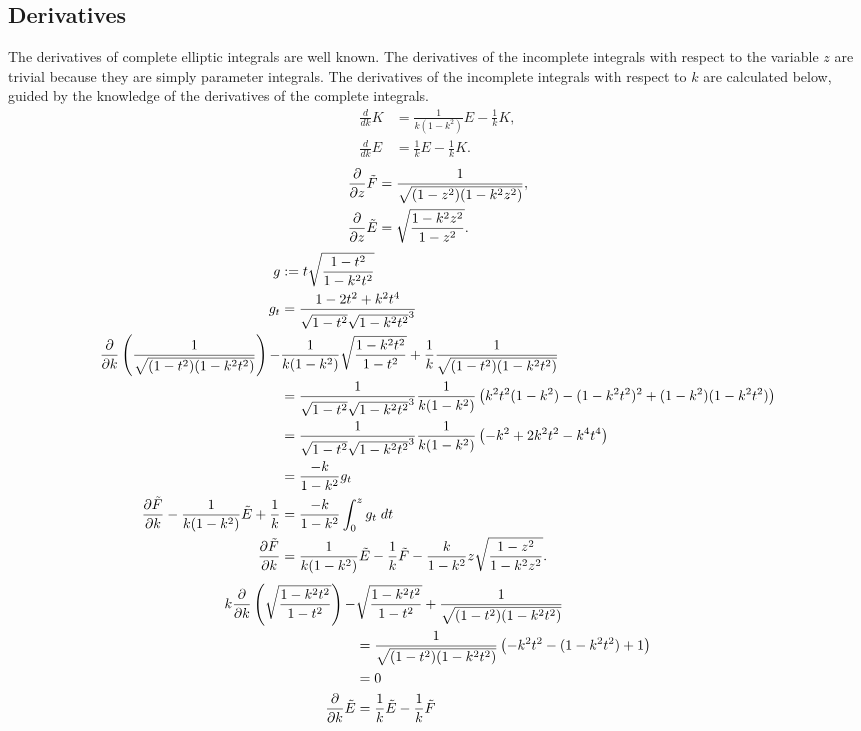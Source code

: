 \subsection{Derivatives}
\label{sub:Derivatives}
The derivatives of complete elliptic integrals are well known. The derivatives of the incomplete integrals with respect to the variable $z$ are trivial because they are simply parameter integrals. The derivatives of the incomplete integrals with respect to $k$ are calculated below, guided by the knowledge of the derivatives of the complete integrals.
\begin{align}
\frac{d}{dk}K &= \frac{1}{k(1-k^2)}E - \frac{1}{k}K, \\
\frac{d}{dk}E &= \frac{1}{k}E - \frac{1}{k} K.
\end{align}
\begin{align}
\frac{\partial }{\partial z}\tilde F &= \frac{1}{\sqrt{(1-z^2)(1-k^2 z^2)}}, \\
\frac{\partial }{\partial z}\tilde E &= \sqrt{\frac{1-k^2 z^2}{1-z^2}}.
\end{align}
\begin{align}
g &:= t\sqrt{\frac{1-t^2}{1-k^2t^2}} \\
g_t &= \frac{1-2t^2 + k^2 t^4}{\sqrt{1-t^2}\sqrt{1-k^2t^2}^3} \\
\frac{\partial }{\partial k}\left(\frac{1}{\sqrt{(1-t^2)(1-k^2 t^2)}}\right) -& \frac{1}{k(1-k^2)}\sqrt{\frac{1-k^2 t^2}{1-t^2}} + \frac{1}{k}\frac{1}{\sqrt{(1-t^2)(1-k^2 t^2)}} \\
&= \frac{1}{\sqrt{1-t^2}\sqrt{1-k^2t^2}^3}\frac{1}{k(1-k^2)}\left( k^2t^2(1-k^2) - (1-k^2t^2)^2 + (1-k^2)(1-k^2t^2) \right) \\
&= \frac{1}{\sqrt{1-t^2}\sqrt{1-k^2t^2}^3}\frac{1}{k(1-k^2)}\left( -k^2 + 2k^2t^2 -k^4t^4\right) \\
&= \frac{-k}{1-k^2}g_t \\
\frac{\partial \tilde F}{\partial k} - \frac{1}{k(1-k^2)}\tilde E + \frac{1}{k} &= \frac{-k}{1-k^2}\int_0^z g_t\; dt \\
\frac{\partial \tilde F}{\partial k} &= \frac{1}{k(1-k^2)}\tilde E - \frac{1}{k}\tilde F - \frac{k}{1-k^2}z\sqrt{\frac{1-z^2}{1-k^2z^2}}.
\end{align}
\begin{align}
k\frac{\partial }{\partial k}\left(\sqrt{\frac{1-k^2t^2}{1-t^2}}\right) -& \sqrt{\frac{1-k^2t^2}{1-t^2}} + \frac{1}{\sqrt{(1-t^2)(1-k^2 t^2)}} \\
&= \frac{1}{\sqrt{(1-t^2)(1-k^2 t^2)}}\left(-k^2t^2 - (1-k^2t^2) + 1\right) \\
&= 0\\
\frac{\partial }{\partial k}\tilde E &= \frac{1}{k}\tilde E - \frac{1}{k}\tilde F
\end{align}

